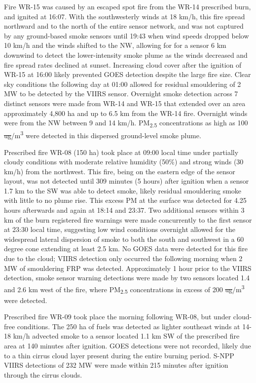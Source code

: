 \documentclass[fire,article,submit,moreauthors]{mdpi}
\providecommand{\DIFadd}[1]{{\protect\color{blue}\uwave{#1}}} %
\providecommand{\DIFdel}[1]{{\protect\color{red}\sout{#1}}} %
\providecommand{\DIFaddbegin}{} %
\providecommand{\DIFaddend}{} %
\providecommand{\DIFdelbegin}{} %
\providecommand{\DIFdelend}{} %
\begin{document}
Fire WR-15 was caused by an escaped spot fire from the WR-14 prescribed
burn, and ignited at 16:07. With the southwesterly winds at 18 km/h,
this fire spread northward and to the north of the entire sensor
network, and was not captured by any ground-based smoke sensors until
19:43 when wind speeds dropped below 10 km/h and the winds shifted to
the NW, allowing for for a sensor 6 km downwind to detect the
lower-intensity smoke plume as the winds decreased and fire spread rates
declined at sunset. Increasing cloud cover after the ignition of WR-15
at 16:00 likely prevented GOES detection despite the large fire size.
Clear sky conditions the following day at 01:00 allowed for residual
smouldering of 2 MW to be detected by the VIIRS sensor. Overnight smoke
detection across 7 distinct sensors were made from WR-14 and WR-15 that
extended over an area approximately 4,800 ha and up to 6.5 km from the
WR-14 fire. Overnight winds were from the NW between 9 and 14 km/h.
PM\textsubscript{2.5} concentrations as high as 100
\DIFdelbegin \DIFdel{ug}\DIFdelend \DIFaddbegin \DIFadd{\(\mu\)g}\DIFaddend /m\textsuperscript{3} were detected in this dispersed
ground-level smoke plume.

Prescribed fire WR-08 (150 ha) took place at 09:00 local time under
partially cloudy conditions with moderate relative humidity (50\%) and
strong winds (30 km/h) from the northwest. This fire, being on the
eastern edge of the sensor layout, was not detected until 309 minutes (5
hours) after ignition when a sensor 1.7 km to the SW was able to detect
smoke, likely residual smouldering smoke with little to no plume rise.
This excess PM at the surface was detected for 4.25 hours afterwards and
again at 18:14 and 23:37. Two additional sensors within 3 km of the burn
registered fire warnings were made concurrently to the first sensor at
23:30 local time, suggesting low wind conditions overnight allowed for
the widespread lateral dispersion of smoke to both the south and
southwest in a 60 degree cone extending at least 2.5 km. No GOES data
were detected for this fire due to the cloud; VIIRS detection only
occurred the following morning when 2 MW of smouldering FRP was
detected. Approximately 1 hour prior to the VIIRS detection, smoke
sensor warning detections were made by two sensors located 1.4 and 2.6
km west of the fire, where PM\textsubscript{2.5} concentrations in
excess of 200 \DIFdelbegin \DIFdel{ug}\DIFdelend \DIFaddbegin \DIFadd{\(\mu\)g}\DIFaddend /m\textsuperscript{3} were detected.

Prescribed fire WR-09 took place the morning following WR-08, but under
cloud-free conditions. The 250 ha of fuels was detected as lighter
southeast winds at 14-18 km/h advected smoke to a sensor located 1.1 km
SW of the prescribed fire area at 140 minutes after ignition. GOES
detections were not recorded, likely due to a thin cirrus cloud layer
present during the entire burning period. S-NPP VIIRS detections of 232
MW were made within 215 minutes after ignition through the cirrus
clouds.
\end{document}
